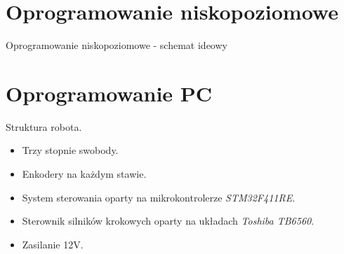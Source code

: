 \documentclass{beamer}
\begin{document}
\section{Oprogramowanie niskopoziomowe}

\begin{frame}{Oprogramowanie niskopoziomowe - schemat ideowy}
\end{frame}

\section{Oprogramowanie PC}

\begin{frame}{Struktura robota.}
	\begin{itemize}
		\item {Trzy stopnie swobody.}
		\item {Enkodery na każdym stawie}.
		\item {System sterowania oparty na mikrokontrolerze \textit{STM32F411RE}.}
		\item {Sterownik silników krokowych oparty na układach \textit{Toshiba TB6560}.}
		\item {Zasilanie 12\textsc{V}.}
	\end{itemize}
\end{frame}
\end{document}

